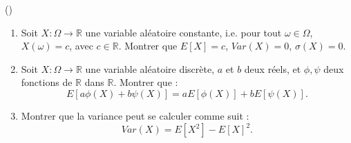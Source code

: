 \begin{exercice}\label{exo4-4} (\minsyndical)

\begin{enumerate}

\item Soit $X : \Omega \rightarrow \mathbb{R}$ une variable al\'eatoire constante, i.e. pour tout $\omega \in \Omega$, $X(\omega) = c$, avec $c\in\mathbb{R}$. Montrer que $E[X] = c$, $Var(X) = 0$, $\sigma (X) = 0$.

\item Soit $X : \Omega \rightarrow \mathbb{R}$ une variable al\'eatoire discr\`ete, $a$ et $b$ deux r\'eels, et $\phi,\psi$ deux fonctions de $\mathbb{R}$ dans $\mathbb{R}$. Montrer que :
\[
E [ a \phi(X) + b \psi(X) ] =
a E [\phi(X)] + b  E [ \psi(X) ].
\]

\item Montrer que la variance peut se calculer comme suit :
\[
Var (X) = E[X^2] - E[X]^2.
\]

\end{enumerate}


\end{exercice}
